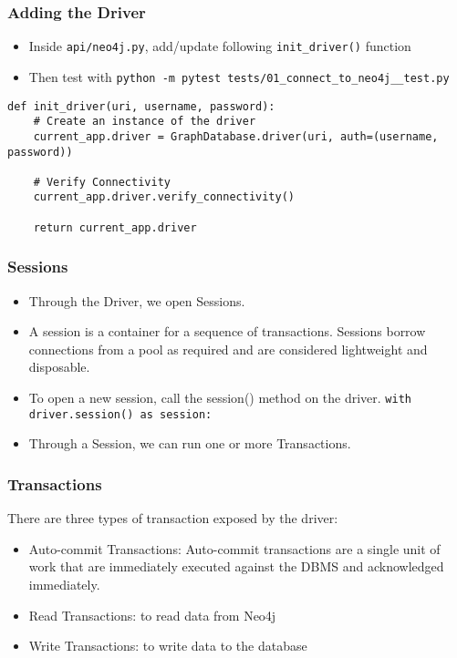 \begin{frame}[fragile]\frametitle{Adding the Driver}
\begin{itemize}
\item Inside \lstinline|api/neo4j.py|, add/update following \lstinline|init_driver()| function
\item Then test with \lstinline|python -m pytest tests/01_connect_to_neo4j__test.py|
\end{itemize}

\begin{lstlisting}
def init_driver(uri, username, password):
    # Create an instance of the driver
    current_app.driver = GraphDatabase.driver(uri, auth=(username, password))

    # Verify Connectivity
    current_app.driver.verify_connectivity()

    return current_app.driver
\end{lstlisting}

\end{frame}

\begin{frame}[fragile]\frametitle{Sessions}
\begin{itemize}
\item Through the Driver, we open Sessions.
\item A session is a container for a sequence of transactions. Sessions borrow connections from a pool as required and are considered lightweight and disposable.
\item To open a new session, call the session() method on the driver. \lstinline|with driver.session() as session:|
\item Through a Session, we can run one or more Transactions.
\end{itemize}

\end{frame}

\begin{frame}[fragile]\frametitle{Transactions}
There are three types of transaction exposed by the driver:


\begin{itemize}
\item Auto-commit Transactions: Auto-commit transactions are a single unit of work that are immediately executed against the DBMS and acknowledged immediately. 
\item Read Transactions: to read data from Neo4j
\item Write Transactions: to write data to the database
\end{itemize}

\end{frame}


